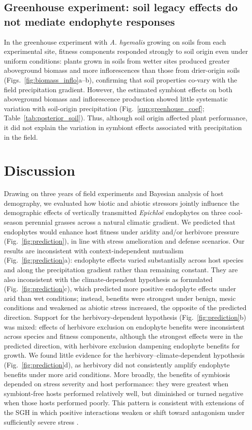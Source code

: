 \documentclass[12pt]{article}\usepackage[]{graphicx}\usepackage[dvipsnames]{xcolor}
\begin{document}
 \subsection*{Greenhouse experiment: soil legacy effects do not mediate endophyte responses}
In the greenhouse experiment with \textit{A. hyemalis} growing on soils from each experimental site, fitness components responded strongly to soil origin even under uniform conditions: plants grown in soils from wetter sites produced greater aboveground biomass and more inflorescences than those from drier-origin soils (Figs.~\ref{fig:biomass_inflo}a--b), confirming that soil properties co-vary with the field precipitation gradient. However, the estimated symbiont effects on both aboveground biomass and inflorescence production showed little systematic variation with soil-origin precipitation (Fig.~\ref{sup:greenhouse_coef}; Table~\ref{tab:posterior_soil}). Thus, although soil origin affected plant performance, it did not explain the variation in symbiont effects associated with precipitation in the field.

\section*{Discussion}
Drawing on three years of field experiments and Bayesian analysis of host demography, we evaluated how biotic and abiotic stressors jointly influence the demographic effects of vertically transmitted \textit{Epichloë} endophytes on three cool-season perennial grasses across a natural climatic gradient. We predicted that endophytes would enhance host fitness under aridity and/or herbivore pressure (Fig.~\ref{fig:prediction}), in line with stress amelioration and defense scenarios.
Our results are inconsistent with context-independent mutualism (Fig.~\ref{fig:prediction}a): endophyte effects varied substantially across host species and along the precipitation gradient rather than remaining constant.
They are also inconsistent with the climate-dependent hypothesis as formulated (Fig.~\ref{fig:prediction}c), which predicted more positive endophyte effects under arid than wet conditions; instead, benefits were strongest under benign, mesic conditions and weakened as abiotic stress increased, the opposite of the predicted direction.
Support for the herbivory-dependent hypothesis (Fig.~\ref{fig:prediction}b) was mixed: effects of herbivore exclusion on endophyte benefits were inconsistent across species and fitness components, although the strongest effects were in the predicted direction, with herbivore exclusion dampening endophyte benefits for growth.
We found little evidence for the herbivory--climate-dependent hypothesis (Fig.~\ref{fig:prediction}d), as herbivory did not consistently amplify endophyte benefits under more arid conditions.
More broadly, the benefits of symbiosis depended on stress severity and host performance: they were greatest when symbiont-free hosts performed relatively well, but diminished or turned negative when those hosts performed poorly. 
This pattern is consistent with extensions of the SGH in which positive interactions weaken or shift toward antagonism under sufficiently severe stress \citep{le2010interaction,kawai2007testing,michalet2007highlighting}.
\end{document}

